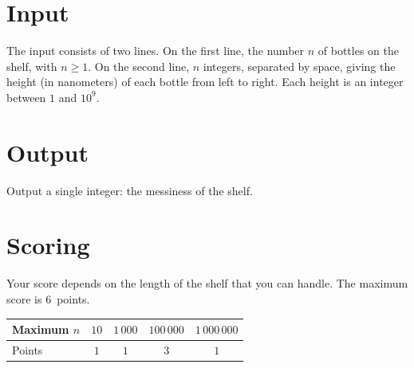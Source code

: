 \section*{Input}

The input consists of two lines.
On the first line, the number $n$ of bottles on the shelf, with $n\geq 1$.
On the second line, $n$ integers, separated by space, giving the height (in nanometers) of each bottle from left to right.
Each height is an integer between $1$ and $10^9$.

\section*{Output}

Output a single integer: the messiness of the shelf.

\section*{Scoring}

Your score depends on the length of the shelf that you can handle.
The maximum score is $6$~points.

\medskip
\noindent
\begin{tabular}{lcccc}
Maximum $n$ & $10$ & $1\,000$  & $100\,000$ & $1\,000\,000$ \\ \hline
Points      & $1$  & $1$       & $3$        & $1$ \\
\end{tabular}
